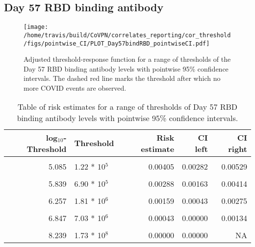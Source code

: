 \documentclass[]{book}
\theoremstyle{definition}
\theoremstyle{definition}
\theoremstyle{definition}
\newcommand{\1}{\mathbbm{1}}
\begin{document}
\newpage

\newpage

\newpage

\hypertarget{day-57-rbd-binding-antibody}{%
\subsection{Day 57 RBD binding antibody}\label{day-57-rbd-binding-antibody}}

\begin{figure}[H]
\centering
\texttt{[image: /home/travis/build/CoVPN/correlates\_reporting/cor\_threshold/figs/pointwise\_CI/PLOT\_Day57bindRBD\_pointwiseCI.pdf]}
\caption{Adjusted threshold-response function for a range of thresholds of the
  Day 57 RBD binding antibody levels with pointwise 95\% confidence intervals. The dashed red line marks the threshold after which no more COVID events are observed. }
\end{figure}
\begin{table}[!h]

\caption{\label{tab:unnamed-chunk-349}Table of risk estimates for a range of thresholds of Day 57 RBD binding antibody levels with pointwise 95\% confidence intervals.}
\centering
\begin{tabular}[t]{rlrrr}
\toprule
log$_{10}$-Threshold & Threshold & Risk estimate & CI left & CI right\\
\midrule
\cellcolor{gray!6}{4.062} & \cellcolor{gray!6}{1.15 * 10$^4$} & \cellcolor{gray!6}{0.00490} & \cellcolor{gray!6}{0.00360} & \cellcolor{gray!6}{0.00619}\\
5.085 & 1.22 * 10$^5$ & 0.00405 & 0.00282 & 0.00529\\
\cellcolor{gray!6}{5.507} & \cellcolor{gray!6}{3.21 * 10$^5$} & \cellcolor{gray!6}{0.00377} & \cellcolor{gray!6}{0.00247} & \cellcolor{gray!6}{0.00507}\\
5.839 & 6.90 * 10$^5$ & 0.00288 & 0.00163 & 0.00414\\
\cellcolor{gray!6}{6.048} & \cellcolor{gray!6}{1.12 * 10$^6$} & \cellcolor{gray!6}{0.00238} & \cellcolor{gray!6}{0.00113} & \cellcolor{gray!6}{0.00364}\\
6.257 & 1.81 * 10$^6$ & 0.00159 & 0.00043 & 0.00275\\
\cellcolor{gray!6}{6.499} & \cellcolor{gray!6}{3.16 * 10$^6$} & \cellcolor{gray!6}{0.00131} & \cellcolor{gray!6}{0.00007} & \cellcolor{gray!6}{0.00255}\\
6.847 & 7.03 * 10$^6$ & 0.00043 & 0.00000 & 0.00134\\
\cellcolor{gray!6}{7.181} & \cellcolor{gray!6}{1.52 * 10$^7$} & \cellcolor{gray!6}{0.00087} & \cellcolor{gray!6}{0.00000} & \cellcolor{gray!6}{0.00279}\\
8.239 & 1.73 * 10$^8$ & 0.00000 & 0.00000 & NA\\
\bottomrule
\end{tabular}
\end{table}
\end{document}
